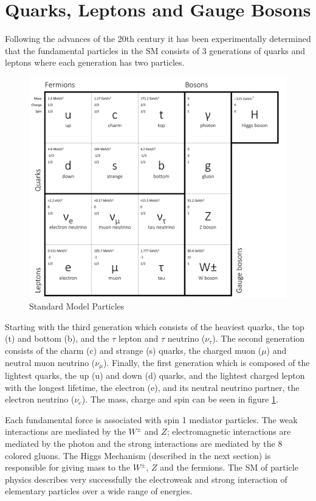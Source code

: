 \section{Quarks, Leptons and Gauge Bosons}
Following the advances of the 20th century it has been experimentally 
determined that the fundamental
particles in the SM consists of 3 generations of quarks and leptons
where each generation has two particles. 
\begin{figure}[hb]
  \centering
	\includegraphics[width=\textwidth]{images/SMParticles2.png}
  	\caption[SM Particles]
   	{Standard Model Particles}
	\label{fig:SMParticles}
\end{figure}
Starting with the third 
generation which consists of the heaviest quarks, the top (t) and bottom (b),
and the $\tau$ lepton and $\tau$ neutrino ($\nu_{\tau}$).
The second generation consists of the charm (c) and strange (s) quarks,
the charged muon ($\mu$) and neutral muon neutrino ($\nu_{\mu}$).
Finally, the first generation which is composed of the lightest 
quarks, the up (u) and down (d) quarks,
and the lightest charged lepton with the longest lifetime, the electron (e), and its neutral 
neutrino partner, the electron neutrino ($\nu_{e}$). 
The mass, charge and spin can be seen in figure \ref{fig:SMParticles}.

Each fundamental force is associated with spin 1 mediator particles.
The weak interactions are mediated by the $W^{\pm}$ and $Z$;
electromagnetic interactions are mediated by the photon and the strong interactions
are mediated by the 8 colored gluons. The Higgs Mechanism (described in the next section) 
is responsible for giving mass to the $W^{\pm}$, $Z$ and the fermions. 
The SM of particle physics describes very successfully the electroweak and strong
interaction of elementary particles over a wide range of energies.

